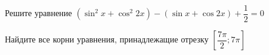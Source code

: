 \begin{ex}
	\begin{condition}
		\begin{enumcols}[label=\asbuk*)]
			\item Решите уравнение \( \left(\sin^2 x + \cos^2 2x\right)-(\sin x + \cos 2x)+\dfrac{1}{2} = 0 \)
			\item Найдите все корни уравнения, принадлежащие отрезку \( \left[\dfrac{7\pi}{2};7\pi\right] \)
		\end{enumcols}
	\end{condition}
\end{ex}
